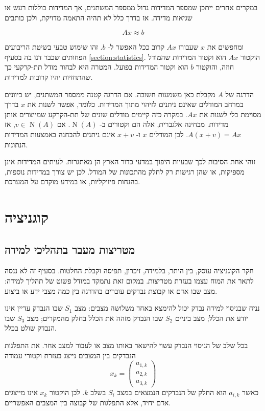 \documentclass[12pt]{report}
\theoremstyle{plain}
\theoremstyle{definition}
\newcommand{\0}{\mathbf{0}}
\DeclareMathOperator{\Null}{N}
\begin{document}
במקרים אחרים ייתכן שמספר המדידות גדול ממספר המשתנים, אך המדידות כוללות רעש או שגיאות מדידה.
אז בדרך כלל לא תהיה התאמה מדויקת, ולכן כותבים

$$
A x \approx b
$$

ומחפשים את
$x$
שעבורו
$Ax$
קרוב ככל האפשר ל-
$b$.
זהו שימוש טבעי בשיטת הריבועים הפחותים שכבר דנו בה בסעיף
\ref{section:statistics}.
הוקטור
$Ax$
הוא וקטור המדידות שהמודל חוזה, והוקטור
$b$
הוא וקטור המדידות בפועל. המטרה היא לבחור מודל תת-קרקעי כך שהתחזיות יהיו קרובות למדידות.

הדרגה של
$A$
מקבלת כאן משמעות חשובה.
אם הדרגה קטנה ממספר המשתנים, יש כיוונים במרחב המודלים שאינם ניתנים לזיהוי מתוך המדידות.
כלומר, אפשר לשנות את
$x$
בדרך מסוימת בלי לשנות את
$Ax$.
במקרה כזה קיימים מודלים שונים של תת-הקרקע שמייצרים אותן מדידות.
מבחינה אלגברית, אלה הם וקטורים ב-
$\Null(A)$.
אם
$v\in\Null(A)$,
אז
$A(x+v)=Ax$.
לכן המודלים
$x$
ו-
$x+v$
אינם ניתנים להבחנה באמצעות המדידות הנתונות.

זוהי אחת הסיבות לכך שבעיות היפוך במדעי כדור הארץ הן מאתגרות. לעיתים המדידות אינן מספיקות, או שהן רגישות רק לחלק מהתכונות של המודל. לכן יש צורך במדידות נוספות, בהנחות פיזיקליות, או במידע מוקדם על המערכת.

\section{קוגניציה}

\subsection*{מטריצות מעבר בתהליכי למידה}

חקר הקוגניציה עוסק, בין היתר, בלמידה, זיכרון, תפיסה וקבלת החלטות.
בסעיף זה לא ננסה לתאר את המוח עצמו בעזרת מטריצות.
במקום זאת נתמקד במודל פשוט של תהליך למידה:
מצב שבו אדם או קבוצת נבדקים עוברים בהדרגה בין כמה מצבי ידע או ביצוע.

נניח שבניסוי למידה נבדק יכול להימצא באחד משלושה מצבים: מצב
$S_1$
שבו הנבדק עדיין אינו יודע את הכלל;
מצב ביניים
$S_2$
שבו הנבדק מזהה את הכלל בחלק מהמקרים;
מצב
$S_3$
שבו הנבדק שולט בכלל.

בכל שלב של הניסוי הנבדק עשוי להישאר באותו מצב או לעבור למצב אחר.
את התפלגות הנבדקים בין המצבים נייצג בעזרת וקטורי עמודה
$$
x_k =
\begin{pmatrix}
a_{1,k}\\
a_{2,k}\\
a_{3,k}
\end{pmatrix}
$$
כאשר
$a_{i,k}$
הוא החלק של הנבדקים הנמצאים במצב
$S_i$
בשלב
$k$.
לכן הוקטור
$x_k$
אינו מייצגים אדם יחיד, אלא התפלגות של קבוצה בין המצבים האפשריים.
\end{document}
